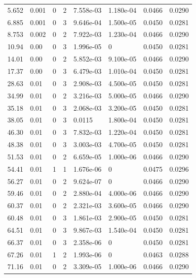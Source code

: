 \documentclass[preview]{standalone}
\begin{document}
{{\begin{tabular}{L{1.2cm}C{1.2cm} C{0.3cm}C{0.5cm} C{1.4cm}C{1.4cm} C{1.4cm}C{1.4cm}}
  5.652  &  0.001  & 0     &  2 &  7.558e-03  & 1.180e-04  & 0.0466 &  0.0290   \\ 
  6.885  &  0.001  & 0     &  3 &  9.646e-04  & 1.500e-05  & 0.0450 &  0.0281   \\ 
  8.753  &  0.002  & 0     &  2 &  7.922e-03  & 1.230e-04  & 0.0466 &  0.0290   \\ 
  10.94  &  0.00  & 0     &  3 &  1.996e-05  & 0  & 0.0450 &  0.0281   \\ 
  14.01  &  0.00  & 0     &  2 &  5.852e-03  & 9.100e-05  & 0.0466 &  0.0290   \\ 
  17.37  &  0.00  & 0     &  3 &  6.479e-03  & 1.010e-04  & 0.0450 &  0.0281   \\ 
  28.63  &  0.01  & 0     &  3 &  2.908e-03  & 4.500e-05  & 0.0450 &  0.0281   \\ 
  34.99  &  0.01  & 0     &  2 &  3.216e-03  & 5.000e-05  & 0.0466 &  0.0290   \\ 
  35.18  &  0.01  & 0     &  3 &  2.068e-03  & 3.200e-05  & 0.0450 &  0.0281   \\ 
  38.05  &  0.01  & 0     &  3 &  0.0115  & 1.800e-04  & 0.0450 &  0.0281   \\ 
  46.30  &  0.01  & 0     &  3 &  7.832e-03  & 1.220e-04  & 0.0450 &  0.0281   \\ 
  48.38  &  0.01  & 0     &  3 &  3.003e-03  & 4.700e-05  & 0.0450 &  0.0281   \\ 
  51.53  &  0.01  & 0     &  2 &  6.659e-05  & 1.000e-06  & 0.0466 &  0.0290   \\ 
  54.41  &  0.01  & 1     &  1 &  1.676e-06  & 0  & 0.0475 &  0.0296   \\ 
  56.27  &  0.01  & 0     &  2 &  9.624e-07  & 0  & 0.0466 &  0.0290   \\ 
  59.46  &  0.01  & 0     &  2 &  2.880e-04  & 4.000e-06  & 0.0466 &  0.0290   \\ 
  60.37  &  0.01  & 0     &  2 &  2.321e-03  & 3.600e-05  & 0.0466 &  0.0290   \\ 
  60.48  &  0.01  & 0     &  3 &  1.861e-03  & 2.900e-05  & 0.0450 &  0.0281   \\ 
  64.51  &  0.01  & 0     &  3 &  9.867e-03  & 1.540e-04  & 0.0450 &  0.0281   \\ 
  66.37  &  0.01  & 0     &  3 &  2.358e-06  & 0  & 0.0450 &  0.0281   \\ 
  67.26  &  0.01  & 1     &  2 &  1.993e-06  & 0  & 0.0463 &  0.0288   \\ 
  71.16  &  0.01  & 0     &  2 &  3.309e-05  & 1.000e-06  & 0.0466 &  0.0290   \\ 

\end{tabular}}}
\end{document}
